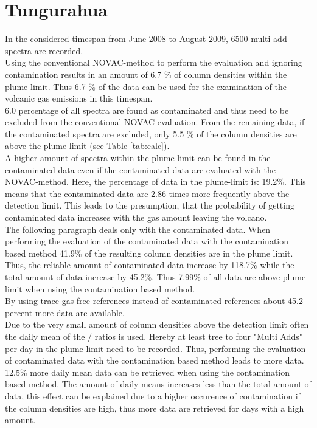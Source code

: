 \documentclass  [
  paper    = a4,
  BCOR     = 10mm,
  twoside,
  fontsize = 12pt,
  fleqn,
  toc      = bibnumbered,
  toc      = listofnumbered,
  numbers  = noendperiod,
  headings = normal,
  listof   = leveldown,
  version  = 3.03
]                                       {scrreprt}
\begin{document}
\section{Tungurahua}
	In the considered timespan from June 2008 to August 2009, 6500 multi add spectra are recorded. \\
	Using the conventional NOVAC-method to perform the evaluation and ignoring contamination results in an amount of 6.7 \% of   column densities within the plume limit. Thus 6.7 \% of the data can be used for the examination of the volcanic gas emissions in this timespan.\\
 	6.0 percentage of all spectra are found as contaminated and thus need to be excluded from the conventional NOVAC-evaluation. From the remaining data,  if the contaminated spectra are excluded, only 5.5 \% of the   column densities are above the plume limit  (see  Table \ref{tab:calc}). \\
 	A higher amount of spectra within the   plume limit can be found in the contaminated data even if the contaminated data are evaluated with the NOVAC-method. Here, the percentage of data in the plume-limit is: 19.2\%.
 	This means that the contaminated data are 2.86 times more frequently above the detection limit. This leads to the presumption, that the probability of getting contaminated data increases with the gas amount leaving the volcano.\\
 	The following paragraph deals only with the contaminated data.	
 	When performing the evaluation of the contaminated data with the contamination based method 41.9\% of the resulting   column densities are in the plume limit. Thus, the reliable amount of contaminated data increase by 118.7\% while the total amount of data increase by 45.2\%. Thus 7.99\% of all data are above plume limit when using the contamination based method.\\
 	By using trace gas free references instead of contaminated references about 45.2 percent more data are available. \\
 	Due to the very small amount of   column densities above the detection limit often the daily mean of the /  ratios is used. Hereby at least tree to four "Multi Adds" per day in the plume limit need to be recorded. Thus, performing the evaluation of contaminated data with the contamination based method leads to more data.
 	 12.5\% more daily mean data can be retrieved when using the contamination based method. The amount of daily means increases less than the total amount of data, this effect can be explained due to a higher occurence of contamination if the   column densities are high, thus more data are retrieved for days with a high   amount.
\end{document}
